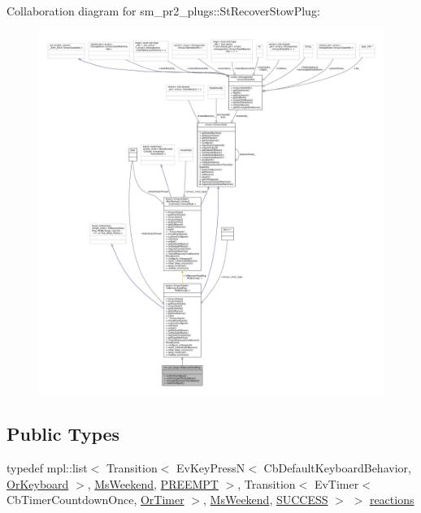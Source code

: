 Collaboration diagram for sm\+\_\+pr2\+\_\+plugs\+:\+:St\+Recover\+Stow\+Plug\+:
\nopagebreak
\begin{figure}[H]
\begin{center}
\leavevmode
\includegraphics[width=350pt]{structsm__pr2__plugs_1_1StRecoverStowPlug__coll__graph}
\end{center}
\end{figure}
\subsection*{Public Types}
\begin{DoxyCompactItemize}
\item 
typedef mpl\+::list$<$ Transition$<$ Ev\+Key\+PressN$<$ Cb\+Default\+Keyboard\+Behavior, \hyperlink{classsm__pr2__plugs_1_1OrKeyboard}{Or\+Keyboard} $>$, \hyperlink{classsm__pr2__plugs_1_1MsWeekend}{Ms\+Weekend}, \hyperlink{classPREEMPT}{P\+R\+E\+E\+M\+PT} $>$, Transition$<$ Ev\+Timer$<$ Cb\+Timer\+Countdown\+Once, \hyperlink{classsm__pr2__plugs_1_1OrTimer}{Or\+Timer} $>$, \hyperlink{classsm__pr2__plugs_1_1MsWeekend}{Ms\+Weekend}, \hyperlink{classSUCCESS}{S\+U\+C\+C\+E\+SS} $>$ $>$ \hyperlink{structsm__pr2__plugs_1_1StRecoverStowPlug_a26060a2f965fc75de855e40cefdcac7b}{reactions}
\end{DoxyCompactItemize}
